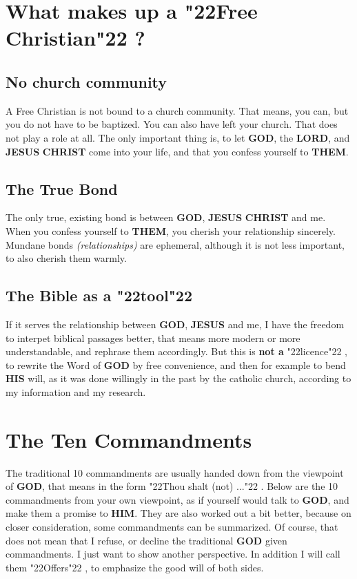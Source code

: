 \documentclass[12pt,a4paper]{article}
\newcommand{\Christ}[0]{\textbf{CHRIST}}
\newcommand{\God}[0]{\textbf{GOD}}
\newcommand{\Him}[0]{\textbf{HIM}}
\newcommand{\His}[0]{\textbf{HIS}}
\newcommand{\Jesus}[0]{\textbf{JESUS}}
\newcommand{\Lord}[0]{\textbf{LORD}}
\newcommand{\Them}[0]{\textbf{THEM}}
\newcommand{\q}[1]{\char"22{#1}\char"22 }
\begin{document}
	
	\section{What makes up a \q{Free Christian}?}
	
	\subsection{No church community}
		A Free Christian is not bound to a church community.
		That means,
		you can,
		but you do not have to be baptized.
		You can also have left your church.
		That does not play a role at all.
		The only important thing is,
		to let {\God},
		the {\Lord},
		and {\Jesus} {\Christ} come into your life,
		and that you confess yourself to {\Them}.
	
	\subsection{The True Bond}
		The only true,
		existing bond is between {\God},
		{\Jesus} {\Christ} and me.
		When you confess yourself to {\Them},
		you cherish your relationship sincerely.
		Mundane bonds \textit{(relationships)} are ephemeral,
		although it is not less important,
		to also cherish them warmly.
	
	\subsection{The Bible as a \q{tool}}
		If it serves the relationship between {\God},
		{\Jesus} and me,
		I have the freedom to interpet biblical passages better,
		that means more modern or more understandable,
		and rephrase them accordingly.
		But this is \textbf{not a} \q{licence},
		to rewrite the Word of {\God} by free convenience,
		and then for example to bend {\His} will,
		as it was done willingly in the past by the catholic church,
		according to my information and my research.
		
	\section{The Ten Commandments}
		The traditional 10 commandments are usually handed down from the viewpoint of {\God},
		that means in the form \q{Thou shalt (not) ...}.
		Below are the 10 commandments from your own viewpoint,
		as if yourself would talk to {\God},
		and make them a promise to {\Him}.
		They are also worked out a bit better,
		because on closer consideration,
		some commandments can be summarized.
		Of course,
		that does not mean that I refuse,
		or decline the traditional {\God} given commandments.
		I just want to show another perspective.
		In addition I will call them \q{Offers},
		to emphasize the good will of both sides.
	
\end{document}
